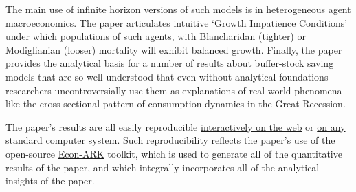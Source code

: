\documentclass[BufferStockTheory]{subfiles}
\begin{document}
The main use of infinite horizon versions of such models is in heterogeneous agent macroeconomics. The paper articulates intuitive \href{https://econ-ark.github.io/BufferStockTheory#GICAgg}{`Growth Impatience Conditions'} under which populations of such agents, with Blancharidan (tighter) or Modiglianian (looser) mortality will exhibit balanced growth.  Finally, the paper provides the analytical basis for a number of results about buffer-stock saving models that are so well understood that even without analytical foundations researchers uncontroversially use them as explanations of real-world phenomena like the cross-sectional pattern of consumption dynamics in the Great Recession.

The paper's results are all easily reproducible \href{https://econ-ark.org/_materials/BufferStockTheory?launch}{interactively on the web} or \href{https://github.com/econ-ark/BufferStockTheory}{on any standard computer system}.  Such reproducibility reflects the paper's use of the open-source \href{https://econ-ark.org}{Econ-ARK} toolkit, which is used to generate all of the quantitative results of the paper, and which integrally incorporates all of the analytical insights of the paper.


\clearpage\vfill\eject
\begin{equation*}
  \label{eq:Dummy}
\end{equation*}

\onlyinsubfile{}
\end{document}
